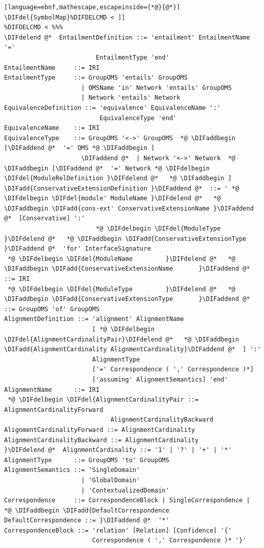\documentclass[10pt,fleqn,final]{scrreprt}
\newenvironment{definitions}[0]{\medskip }{}
\providecommand{\DIFadd}[1]{{\protect\color{blue}\uwave{#1}}} %
\providecommand{\DIFdel}[1]{{\protect\color{red}\sout{#1}}}                      %
\providecommand{\DIFaddbegin}{} %
\providecommand{\DIFaddend}{} %
\providecommand{\DIFdelbegin}{} %
\providecommand{\DIFdelend}{} %
\begin{document}
\begin{definitions}
\begin{lstlisting}[language=ebnf,mathescape,escapeinside={*@}{@*}]
\DIFdel{SymbolMap}%DIFDELCMD < ]]
%DIFDELCMD < %%%
\DIFdelend @*  EntailmentDefinition ::= 'entailment' EntailmentName '='
                         EntailmentType 'end'
EntailmentName     ::= IRI
EntailmentType     ::= GroupOMS 'entails' GroupOMS
                     | OMSName 'in' Network 'entails' GroupOMS
                     | Network 'entails' Network
EquivalenceDefinition ::= 'equivalence' EquivalenceName ':'
                          EquivalenceType 'end'
EquivalenceName    ::= IRI
EquivalenceType    ::= GroupOMS '<->' GroupOMS  *@ \DIFaddbegin [\DIFaddend @*  '=' OMS *@ \DIFaddbegin ]
                     \DIFaddend @*  | Network '<->' Network  *@ \DIFaddbegin [\DIFaddend @*  '=' Network *@ \DIFdelbegin \DIFdel{ModuleRelDefinition }\DIFdelend @*   *@ \DIFaddbegin ]
\DIFadd{ConservativeExtensionDefinition }\DIFaddend @*  ::= ' *@ \DIFdelbegin \DIFdel{module' ModuleName }\DIFdelend @*   *@ \DIFaddbegin \DIFadd{cons-ext' ConservativeExtensionName }\DIFaddend @*  [Conservative] ':'
                         *@ \DIFdelbegin \DIFdel{ModuleType }\DIFdelend @*   *@ \DIFaddbegin \DIFadd{ConservativeExtensionType }\DIFaddend @*  'for' InterfaceSignature
 *@ \DIFdelbegin \DIFdel{ModuleName         }\DIFdelend @*   *@ \DIFaddbegin \DIFadd{ConservativeExtensionName       }\DIFaddend @*  ::= IRI
 *@ \DIFdelbegin \DIFdel{ModuleType         }\DIFdelend @*   *@ \DIFaddbegin \DIFadd{ConservativeExtensionType       }\DIFaddend @*  ::= GroupOMS 'of' GroupOMS
AlignmentDefinition ::= 'alignment' AlignmentName
                        [ *@ \DIFdelbegin \DIFdel{AlignmentCardinalityPair}\DIFdelend @*   *@ \DIFaddbegin \DIFadd{AlignmentCardinality AlignmentCardinality}\DIFaddend @*  ] ':'
                        AlignmentType
                        ['=' Correspondence ( ',' Correspondence )*]
                        ['assuming' AlignmentSemantics] 'end'
AlignmentName      ::= IRI
 *@ \DIFdelbegin \DIFdel{AlignmentCardinalityPair ::= AlignmentCardinalityForward
                             AlignmentCardinalityBackward
AlignmentCardinalityForward ::= AlignmentCardinality
AlignmentCardinalityBackward ::= AlignmentCardinality
}\DIFdelend @*  AlignmentCardinality ::= '1' | '?' | '+' | '*'
AlignmentType      ::= GroupOMS 'to' GroupOMS
AlignmentSemantics ::= 'SingleDomain'
                     | 'GlobalDomain'
                     | 'ContextualizedDomain'
Correspondence     ::= CorrespondenceBlock | SingleCorrespondence |  *@ \DIFaddbegin \DIFadd{DefaultCorrespondence
DefaultCorrespondence ::= }\DIFaddend @*  '*' 
CorrespondenceBlock ::= 'relation' [Relation] [Confidence] '{'
                        Correspondence ( ',' Correspondence )* '}'

\end{lstlisting}
\end{definitions}
\end{document}
